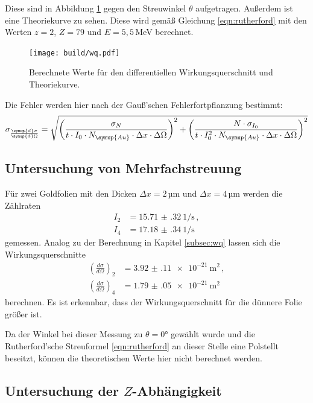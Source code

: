 Diese sind in Abbildung \ref{fig:wq} gegen den Streuwinkel $\theta$ aufgetragen. Außerdem ist
eine Theoriekurve zu sehen. Diese wird gemäß Gleichung \eqref{eqn:rutherford} mit den
Werten $z=2$, $Z=79$ und $E=5{,}5$\,MeV \cite{energie} berechnet.

\begin{figure}
  \centering
  \texttt{[image: build/wq.pdf]}
  \caption{Berechnete Werte für den differentiellen Wirkungsquerschnitt und Theoriekurve.}
  \label{fig:wq}
\end{figure}

Die Fehler werden hier nach der Gauß'schen Fehlerfortpflanzung bestimmt:
\begin{equation*}
  \sigma_{\frac{\symup{d}\sigma}{\symup{d}\Omega}} = \sqrt{\left(\frac{\sigma_N}{t \cdot I_0 \cdot N_{\symup{Au}} \cdot \Delta x \cdot \Delta \Omega}\right)^2
  + \left(\frac{N \cdot \sigma_{I_0}}{t \cdot I_0^2 \cdot N_{\symup{Au}} \cdot \Delta x \cdot \Delta \Omega}\right)^2}
\end{equation*}


\subsection{Untersuchung von Mehrfachstreuung}
\label{subsec:mehrfach}

Für zwei Goldfolien mit den Dicken $\Delta x=2$\,µm und $\Delta x=4$\,µm werden
die Zählraten
\begin{align*}
  I_2&= \SI{15.71(32)}{1\per\second}\,,\\
  I_4&= \SI{17.18(34)}{1\per\second}
\end{align*}
gemessen. Analog zu der Berechnung in Kapitel \ref{subsec:wq} lassen sich die Wirkungsquerschnitte
\begin{align*}
  \left(\frac{d \sigma}{d \Omega}\right)_2&=\SI{3.92(11)e-21}{\metre\squared} \,, \\
  \left(\frac{d \sigma}{d \Omega}\right)_4&=\SI{1.79(05)e-21}{\metre\squared}
\end{align*}
berechnen. Es ist erkennbar, dass der Wirkungsquerschnitt für die dünnere Folie
größer ist.

Da der Winkel bei dieser Messung zu $\theta=0°$ gewählt wurde und die
Rutherford'sche Streuformel \eqref{eqn:rutherford} an dieser Stelle eine Polstellt beseitzt,
können die theoretischen Werte hier nicht berechnet werden.

\subsection{Untersuchung der $Z$-Abhängigkeit}
\label{subsec:z}


